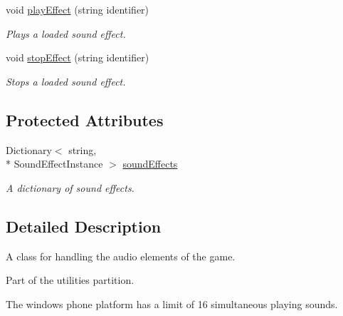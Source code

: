 \begin{DoxyCompactItemize}
void \hyperlink{classwp__engine_1_1_audio_handler_af7737d9bad76b2394b32f3aed503d65c}{play\-Effect} (string identifier)
\begin{DoxyCompactList}\small\item\em Plays a loaded sound effect. \end{DoxyCompactList}\item 
void \hyperlink{classwp__engine_1_1_audio_handler_ab940dce57d9fe0fb88225fb1063e73c9}{stop\-Effect} (string identifier)
\begin{DoxyCompactList}\small\item\em Stops a loaded sound effect. \end{DoxyCompactList}\end{DoxyCompactItemize}
\subsection*{Protected Attributes}
\begin{DoxyCompactItemize}
\item 
\hypertarget{classwp__engine_1_1_audio_handler_a3db724fa0dd962cc7b124a305d2f05ac}{Dictionary$<$ string, \\*
Sound\-Effect\-Instance $>$ \hyperlink{classwp__engine_1_1_audio_handler_a3db724fa0dd962cc7b124a305d2f05ac}{sound\-Effects}}\label{classwp__engine_1_1_audio_handler_a3db724fa0dd962cc7b124a305d2f05ac}

\begin{DoxyCompactList}\small\item\em A dictionary of sound effects. \end{DoxyCompactList}\end{DoxyCompactItemize}


\subsection{Detailed Description}
A class for handling the audio elements of the game. 

Part of the utilities partition.

The windows phone platform has a limit of 16 simultaneous playing sounds. 

